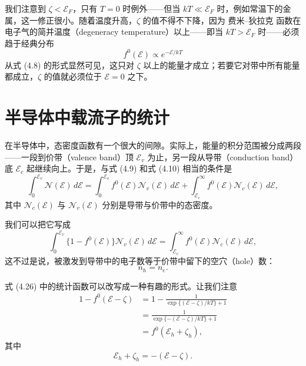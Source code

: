 我们注意到 $\zeta<\mathcal{E}_F$，只有 $T=0$ 时例外——但当 $kT\ll\mathcal{E}_F$ 时，例如常温下的金属，这一修正很小。随着温度升高，$\zeta$ 的值不得不下降，因为 费米–狄拉克 函数在电子气的简并温度（degeneracy temperature）以上——即当 $kT>\mathcal{E}_F$ 时——必须趋于经典分布
\begin{equation*}
f^0(\mathcal{E})\propto e^{-\mathcal{E}/kT}
\tag{4.24}
\end{equation*}
从式 (4.8) 的形式显然可见，这只对 $\zeta$ 以上的能量才成立；若要它对带中所有能量都成立，$\zeta$ 的值就必须位于 $\mathcal{E}=0$ 之下。

\section{半导体中载流子的统计}

在半导体中，态密度函数有一个很大的间隙。实际上，能量的积分范围被分成两段——一段到价带（valence band）顶 $\mathcal{E}_v$ 为止，另一段从导带（conduction band）底 $\mathcal{E}_c$ 起继续向上。于是，与式 (4.9) 和式 (4.10) 相当的条件是
\begin{equation*}
\int_0^{\mathcal{E}_v} \mathcal{N}(\mathcal{E})\,d\mathcal{E} = \int_0^{\mathcal{E}_v} f^0(\mathcal{E})\mathcal{N}_v(\mathcal{E})\,d\mathcal{E} + \int_{\mathcal{E}_c}^{\infty} f^0(\mathcal{E})\mathcal{N}_c(\mathcal{E})\,d\mathcal{E},
\tag{4.25}
\end{equation*}
其中 $\mathcal{N}_c(\mathcal{E})$ 与 $\mathcal{N}_v(\mathcal{E})$ 分别是导带与价带中的态密度。

我们可以把它写成
\begin{equation*}
\int_0^{\mathcal{E}_v} \{1-f^0(\mathcal{E})\}\mathcal{N}_v(\mathcal{E})\,d\mathcal{E} = \int_{\mathcal{E}_c}^{\infty} f^0(\mathcal{E})\mathcal{N}_c(\mathcal{E})\,d\mathcal{E},
\tag{4.26}
\end{equation*}
这不过是说，被激发到导带中的电子数等于价带中留下的空穴（hole）数：
\begin{equation*}
n_h = n_e.
\tag{4.27}
\end{equation*}

式 (4.26) 中的统计函数可以改写成一种有趣的形式。让我们注意
\begin{align*}
1-f^0(\mathcal{E}-\zeta) &= 1 - \frac{1}{\exp\{(\mathcal{E}-\zeta)/kT\}+1} \\
&= \frac{1}{\exp\{-(\mathcal{E}-\zeta)/kT\}+1} \\
&= f^0(\mathcal{E}_h+\zeta_h),
\tag{4.28}
\end{align*}
其中
\begin{equation*}
\mathcal{E}_h+\zeta_h = -(\mathcal{E}-\zeta).
\tag{4.29}
\end{equation*}

